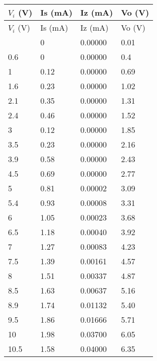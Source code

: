 \documentclass{scrartcl}
\begin{document}
\begin{longtable}{|l|l|l|l|}
        \hline
        $V_i$ (V) & Is (mA) & Iz (mA) & Vo (V) \\ \hline
        \endfirsthead
        \hline
        $V_i$ (V) & Is (mA) & Iz (mA) & Vo (V) \\ \hline
        \endhead
        \hline
        \endfoot
        \hline
        \endlastfoot
        0      & 0       & 0.00000       & 0.01    \\ \hline
        0.6    & 0       & 0.00000       & 0.4     \\ \hline
        1      & 0.12    & 0.00000      & 0.69    \\ \hline
        1.6    & 0.23    & 0.00000       & 1.02    \\ \hline
        2.1    & 0.35    & 0.00000      & 1.31    \\ \hline
        2.4    & 0.46    & 0.00000       & 1.52    \\ \hline
        3      & 0.12    & 0.00000       & 1.85    \\ \hline
        3.5    & 0.23    & 0.00000       & 2.16    \\ \hline
        3.9    & 0.58    & 0.00000      & 2.43    \\ \hline
        4.5    & 0.69    & 0.00000       & 2.77    \\ \hline
        5      & 0.81    & 0.00002       & 3.09    \\ \hline
        5.4    & 0.93    & 0.00008       & 3.31    \\ \hline
        6      & 1.05    & 0.00023       & 3.68    \\ \hline
        6.5    & 1.18    & 0.00040       & 3.92    \\ \hline
        7      & 1.27    & 0.00083       & 4.23    \\ \hline
        7.5    & 1.39    & 0.00161       & 4.57    \\ \hline
        8      & 1.51    & 0.00337       & 4.87    \\ \hline
        8.5    & 1.63    & 0.00637       & 5.16    \\ \hline
        8.9    & 1.74    & 0.01132       & 5.40    \\ \hline
        9.5    & 1.86    & 0.01666       & 5.71    \\ \hline
        10     & 1.98    & 0.03700       & 6.05    \\ \hline
        10.5   & 1.58    & 0.04000       & 6.35    \\ \hline

\end{longtable}
\end{document}
